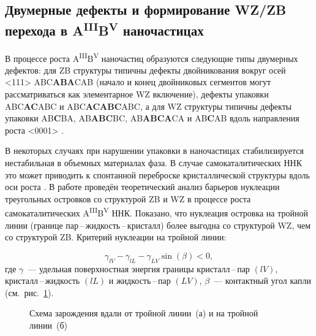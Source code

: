 \subsection{Двумерные дефекты и формирование WZ/ZB перехода в
A\textsuperscript{III}B\textsuperscript{V}
наночастицах}\label{subsec:ch1/sec2/sub5}

В процессе роста A\textsuperscript{III}B\textsuperscript{V} наночастиц
образуются следующие типы двумерных дефектов: для ZB структуры типичны дефекты
двойникования вокруг осей <111> ABC\textbf{ABA}CAB (начало и конец двойниковых
сегментов могут рассматриваться как элементарное WZ включение), дефекты
упаковки ABC\textbf{AC}ABC и ABC\textbf{ACABC}ABC, а для WZ структуры типичны
дефекты упаковки AB\textbf{C}BA, AB\textbf{ABC}BC, AB\textbf{ABCA}CA и
AB\textbf{C}AB вдоль направления роста <0001> \cite{knoll2014,
sourribes2014mobility}.

В некоторых случаях при нарушении упаковки в наночастицах стабилизируется
нестабильная в объемных материалах фаза. В случае самокаталитических ННК это
может приводить к спонтанной переброске кристаллической структуры вдоль оси
роста \cite{Cirlin2010}. В работе \cite{Glas2007} проведён теоретический анализ
барьеров нуклеации треугольных островков со структурой ZB и WZ в процессе роста
самокаталитических A\textsuperscript{III}B\textsuperscript{V} ННК. Показано,
что нуклеация островка на тройной линии (границе
пар\,--\,жидкость\,--\,кристалл) более выгодна со структурой WZ, чем со
структурой ZB. Критерий нуклеации на тройной линии:

\begin{equation} \label{eq:eq_1} \gamma_{lV} - \gamma_{lL} - \gamma_{LV}
\sin(\beta) < 0, \end{equation} где \(\gamma\)~--- удельная поверхностная
энергия границы кристалл\,--\,пар \((lV)\), кристалл\,--\,жидкость \((lL)\) и
жидкость\,--\,пар \((LV)\), \(\beta\)~--- контактный угол капли
(см.~рис.~\cref{fig:Image_7}).

\begin{figure}[ht]   \caption{Схема зарождения вдали от тройной линии~(а) и
на тройной линии~(б) \cite{Glas2007}} \label{fig:Image_7} \end{figure}

